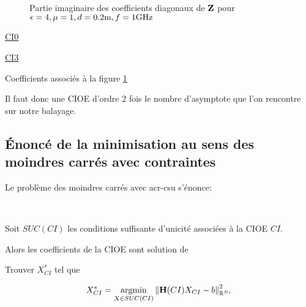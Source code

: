       \begin{figure}[!hbt]
          \centering
          
          \caption[CIOE sur empilement avec triple asymptote]{Partie imaginaire des coefficients diagonaux de \(\mathbf{Z}\) pour \(\epsilon = 4, \mu = 1, d=0.2\text{m}, f=1\text{GHz}\)}
          \label{fig:imp_fourier:plan:triple_asymptote:hoibc}
      \end{figure}
      \begin{table}[!hbt]
        \centering
        \begin{minipage}[t]{0.49\textwidth}
        \vspace{0pt}
        \centering
        \begin{coefftable}{\hyperlink{ci0}{CI0}}
          
        \end{coefftable}

        \begin{coefftable}{\hyperlink{ci3}{CI3}}
          
        \end{coefftable}
        \end{minipage}
        \caption{Coefficients associés à la figure \ref{fig:imp_fourier:plan:triple_asymptote:hoibc}}
        \label{tab:imp_fourier:plan:triple_asymptote:hoibc}
      \end{table}
      Il faut donc une CIOE d'ordre 2 fois le nombre d'asymptote que l'on rencontre sur notre balayage.

\subsection{Énoncé de la minimisation au sens des moindres carrés avec contraintes}
  Le problème des moindres carrés avec \gls{acr-csu} s'énonce:

  \begin{prop}
  ~

  Soit \(SUC(CI)\) les conditions suffisante d'unicité associées à la CIOE \(CI\). 

  Alors les coefficients de la CIOE sont solution de 

  Trouver \(X_{CI}^*\) tel que

  \[
    X_{CI}^* = {\underset{X \in SUC(CI)}{\operatorname{argmin}}} \left\lVert {\mathbf{H}}(CI)X_{CI} - {b}\right\rVert^2_{\mathbb R^{Ni}}
  \]
  \end{prop}
